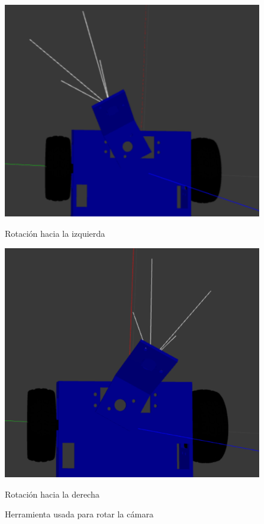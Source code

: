 \begin{figure}[ht!]
	\centering
	\begin{minipage}{0.35\linewidth}
		\centering
		\includegraphics[width=\linewidth]{figs/cap6/rotizq.png}
		\caption*{\centering Rotación hacia la izquierda} 
	\end{minipage}
	\hspace{2cm}
	\begin{minipage}{0.35\linewidth}
		\centering
		\includegraphics[width=\linewidth]{figs/cap6/rotder.png}
		\caption*{\centering Rotación hacia la derecha} 
	\end{minipage}
	\caption{Herramienta usada para rotar la cámara}
	\label{fig:camararot}
\end{figure}


